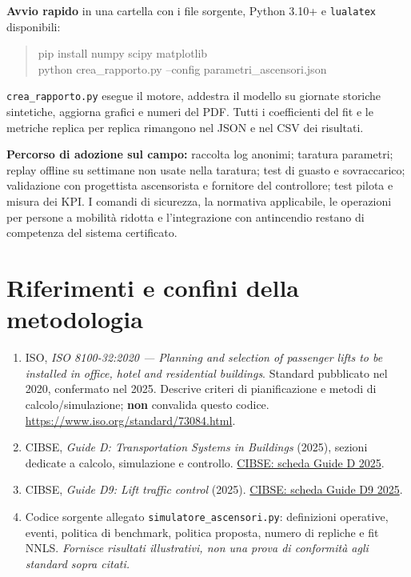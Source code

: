 \documentclass[11pt,a4paper]{article}
\newcommand{\secname}[1]{\vspace{1mm}\section{#1}}
\begin{document}
\textbf{Avvio rapido} in una cartella con i file sorgente, Python 3.10+ e \texttt{lualatex} disponibili:
\begin{quote}\small\ttfamily
pip install numpy scipy matplotlib\\
python crea\_rapporto.py --config parametri\_ascensori.json
\end{quote}
\texttt{crea\_rapporto.py} esegue il motore, addestra il modello su giornate storiche sintetiche, aggiorna grafici e numeri del PDF. Tutti i coefficienti del fit e le metriche replica per replica rimangono nel JSON e nel CSV dei risultati.

\textbf{Percorso di adozione sul campo:} raccolta log anonimi; taratura parametri; replay offline su settimane non usate nella taratura; test di guasto e sovraccarico; validazione con progettista ascensorista e fornitore del controllore; test pilota e misura dei KPI. I comandi di sicurezza, la normativa applicabile, le operazioni per persone a mobilit\`a ridotta e l'integrazione con antincendio restano di competenza del sistema certificato.
\secname{Riferimenti e confini della metodologia}
\begin{enumerate}[leftmargin=7mm]\small
\item ISO, \emph{ISO 8100-32:2020 --- Planning and selection of passenger lifts to be installed in office, hotel and residential buildings}. Standard pubblicato nel 2020, confermato nel 2025. Descrive criteri di pianificazione e metodi di calcolo/simulazione; \textbf{non} convalida questo codice. \url{https://www.iso.org/standard/73084.html}.
\item CIBSE, \emph{Guide D: Transportation Systems in Buildings} (2025), sezioni dedicate a calcolo, simulazione e controllo. \href{https://www.cibse.org/knowledge-research/knowledge-portal/guide-d-transportation-systems-in-buildings-2025/}{CIBSE: scheda Guide D 2025}.
\item CIBSE, \emph{Guide D9: Lift traffic control} (2025). \href{https://www.cibse.org/knowledge-research/knowledge-portal/guide-d9-lift-traffic-control-2025/}{CIBSE: scheda Guide D9 2025}.
\item Codice sorgente allegato \texttt{simulatore\_ascensori.py}: definizioni operative, eventi, politica di benchmark, politica proposta, numero di repliche e fit NNLS. \emph{Fornisce risultati illustrativi, non una prova di conformit\`a agli standard sopra citati.}
\end{enumerate}
\end{document}
